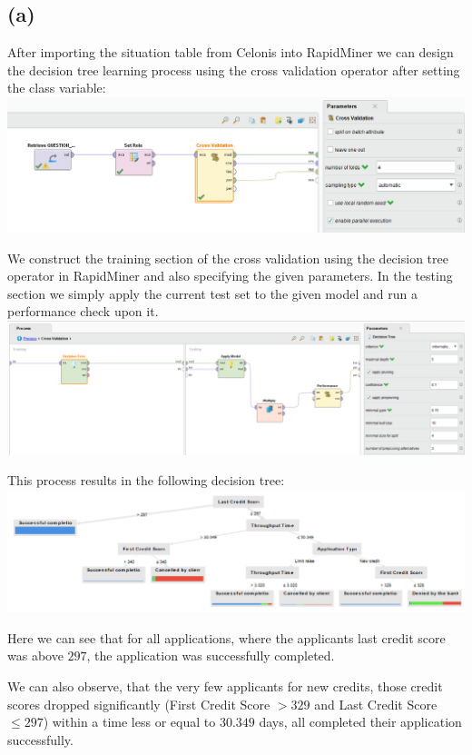 \documentclass[../../main.tex]{subfiles}
\begin{document}
\subsection*{(a)}
After importing the situation table from Celonis into RapidMiner we can design the decision tree learning process using the cross validation operator after setting the class variable: \\
\includegraphics[width=\textwidth]{img/RapidMiner_Process_Overview.png}

We construct the training section of the cross validation using the decision tree operator in RapidMiner and also specifying the given parameters. In the testing section we simply apply the current test set to the given model and run a performance check upon it. \\
\includegraphics[width=\textwidth]{img/RapidMiner_Process_Cross_Validation.png}

This process results in the following decision tree: \\
\includegraphics[width=\textwidth]{img/RapidMiner_Results_Decision_Tree.png}

Here we can see that for all applications, where the applicants last credit score was above $297$, the application was successfully completed.

We can also observe, that the very few applicants for new credits, those credit scores dropped significantly (First Credit Score $> 329$ and Last Credit Score $\leq 297$) within a time less or equal to $30.349$ days, all completed their application successfully.
\end{document}
